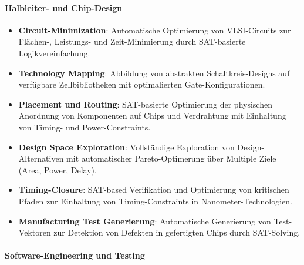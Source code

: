﻿\documentclass[a4paper,12pt]{article}
\theoremstyle{definition}
\begin{document}
\paragraph{Halbleiter- und Chip-Design}

\begin{itemize}
	\item \textbf{Circuit-Minimization}: Automatische Optimierung von VLSI-Circuits zur Flächen-, Leistungs- und Zeit-Minimierung durch SAT-basierte Logikvereinfachung.
	
	\item \textbf{Technology Mapping}: Abbildung von abstrakten Schaltkreis-Designs auf verfügbare Zellbibliotheken mit optimalierten Gate-Konfigurationen.
	
	\item \textbf{Placement und Routing}: SAT-basierte Optimierung der physischen Anordnung von Komponenten auf Chips und Verdrahtung mit Einhaltung von Timing- und Power-Constraints.
	
	\item \textbf{Design Space Exploration}: Vollständige Exploration von Design-Alternativen mit automatischer Pareto-Optimerung über Multiple Ziele (Area, Power, Delay).
	
	\item \textbf{Timing-Closure}: SAT-based Verifikation und Optimierung von kritischen Pfaden zur Einhaltung von Timing-Constraints in Nanometer-Technologien.
	
	\item \textbf{Manufacturing Test Generierung}: Automatische Generierung von Test-Vektoren zur Detektion von Defekten in gefertigten Chips durch SAT-Solving.
\end{itemize}

\paragraph{Software-Engineering und Testing}
\end{document}
